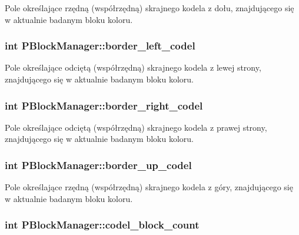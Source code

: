 Pole określające rzędną (współrzędną) skrajnego kodela z dołu, znajdującego się w aktualnie badanym bloku koloru. \hypertarget{classPBlockManager_2bb1887ef5658a211da5edbc3a248058}{
\subsubsection[{border\_\-left\_\-codel}]{\setlength{\rightskip}{0pt plus 5cm}int {\bf PBlockManager::border\_\-left\_\-codel}}}
\label{classPBlockManager_2bb1887ef5658a211da5edbc3a248058}


Pole określające odciętą (współrzędną) skrajnego kodela z lewej strony, znajdującego się w aktualnie badanym bloku koloru. \hypertarget{classPBlockManager_8d73c339ef6be4cd3a960b96b0c4f1fe}{
\subsubsection[{border\_\-right\_\-codel}]{\setlength{\rightskip}{0pt plus 5cm}int {\bf PBlockManager::border\_\-right\_\-codel}}}
\label{classPBlockManager_8d73c339ef6be4cd3a960b96b0c4f1fe}


Pole określające odciętą (współrzędną) skrajnego kodela z prawej strony, znajdującego się w aktualnie badanym bloku koloru. \hypertarget{classPBlockManager_80de22998ec78cc92162eadd6036506f}{
\subsubsection[{border\_\-up\_\-codel}]{\setlength{\rightskip}{0pt plus 5cm}int {\bf PBlockManager::border\_\-up\_\-codel}}}
\label{classPBlockManager_80de22998ec78cc92162eadd6036506f}


Pole określające rzędną (współrzędną) skrajnego kodela z góry, znajdującego się w aktualnie badanym bloku koloru. \hypertarget{classPBlockManager_679ed25c188f4a6d2fd20a167a4bb4eb}{
\subsubsection[{codel\_\-block\_\-count}]{\setlength{\rightskip}{0pt plus 5cm}int {\bf PBlockManager::codel\_\-block\_\-count}}}
\label{classPBlockManager_679ed25c188f4a6d2fd20a167a4bb4eb}


